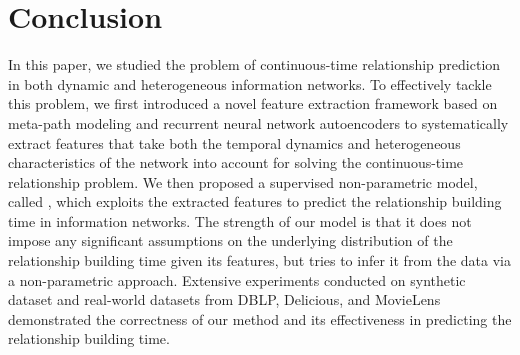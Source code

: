 \section{Conclusion}\label{sec:conclusion}
In this paper, we studied the problem of continuous-time relationship prediction in both dynamic and heterogeneous information networks. To effectively tackle this problem, we first introduced a novel feature extraction framework based on meta-path modeling and recurrent neural network autoencoders to systematically extract features that take both the temporal dynamics and heterogeneous characteristics of the network into account for solving the continuous-time relationship problem. We then proposed a supervised non-parametric model, called \npglm, which exploits the extracted features to predict the relationship building time in information networks. The strength of our model is that it does not impose any significant assumptions on the underlying distribution of the relationship building time given its features, but tries to infer it from the data via a non-parametric approach. Extensive experiments conducted on synthetic dataset and real-world datasets from DBLP, Delicious, and MovieLens demonstrated the correctness of our method and its effectiveness in predicting the relationship building time.